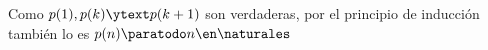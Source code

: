\begin{enumerate}[label=\roman*)]
        Como $p(1), p(k) \ytext p(k+1)$ son verdaderas, por el principio de inducción también lo es
        $p(n) \paratodo n \en \naturales$
\end{enumerate}


\begin{aportes}
  \item {}
\end{aportes}

